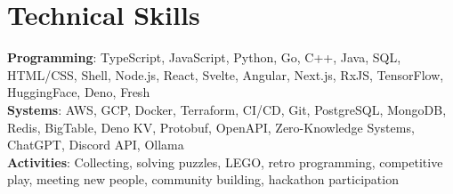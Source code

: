 \documentclass[letterpaper,12pt]{article}
\newcommand{\resumeItem}[1]{
  \item\small{
    {#1 \vspace{-2pt}}
  }
}
\begin{document}
\section{Technical Skills}
\begin{itemize}[leftmargin=0.15in, label={}]
    \resumeItem{\item{
      \textbf{Programming}{: TypeScript, JavaScript, Python, Go, C++, Java, SQL, HTML/CSS, Shell, Node.js, React, Svelte, Angular, Next.js, RxJS, TensorFlow, HuggingFace, Deno, Fresh} \\
      \textbf{Systems}{: AWS, GCP, Docker, Terraform, CI/CD, Git, PostgreSQL, MongoDB, Redis, BigTable, Deno KV, Protobuf, OpenAPI, Zero-Knowledge Systems, ChatGPT, Discord API, Ollama} \\
      \textbf{Activities}{: Collecting, solving puzzles, LEGO, retro programming, competitive play, meeting new people, community building, hackathon participation}
    }}
 \end{itemize}

\end{document}
